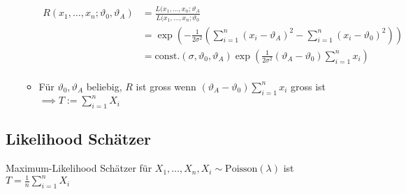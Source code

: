 \begin{itemize}
\begin{itemize}
                \begin{align*}
                    R(x_1, \dots, x_n; \vartheta_0, \vartheta_A) &= \frac{L(x_1, \dots, x_n; \vartheta_A}{L(x_1, \dots, x_n; \vartheta_0}\\
                                                                 &= \exp \left( -\frac{1}{2 \sigma^2} \left( \sum_{i=1}^n (x_i - \vartheta_A)^2 - \sum_{i=1}^n (x_i - \vartheta_0)^2 \right) \right)\\
                                                                 &= \text{const.}(\sigma, \vartheta_0, \vartheta_A) \exp \left( \frac{1}{2 \sigma^2} (\vartheta_A - \vartheta_0) \sum_{i=1}^n x_i \right)\\
                \end{align*}
            \item Für $\vartheta_0, \vartheta_A$ beliebig, $R$ ist gross wenn $(\vartheta_A - \vartheta_0) \sum_{i=1}^n x_i$ gross ist $\implies T := \sum_{i=1}^n X_i$
        \end{itemize}
\end{itemize}

\subsection{Likelihood Schätzer}
\begin{itemize}
     Maximum-Likelihood Schätzer für $X_1, \dots, X_n, X_i \sim \text{Poisson}(\lambda)$ ist $T = \frac{1}{n} \sum_{i=1}^n X_i$
\end{itemize}
